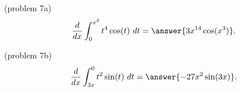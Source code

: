 \documentclass[handout]{ximera}
\begin{document}
\begin{problem}(problem 7a)
\[\frac{d}{dx} \int_0^{x^3} t^4\cos(t) \ dt = \answer{3x^{14}\cos(x^3)}.\]
\end{problem}

\begin{problem}(problem 7b)
\[\frac{d}{dx} \int_{3x}^0 t^2\sin(t) \ dt = \answer{-27x^2\sin(3x)}.\]
\end{problem}


\begin{center}
\begin{foldable}
\end{foldable}
\end{center}
\end{document}
